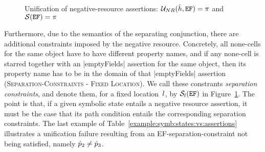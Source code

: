 \begin{figure}[!t]
{\scriptsize
{}}
\vspace*{-0.6cm}
\caption{Unification of negative-resource assertions: ${\mathcal{U}}_{NR}(\hat{h}, \mathtt{EF}) = \pi$ and ${\mathcal{S}}(\mathtt{EF}) = \pi$}
\label{fig:unineg}
\vspace*{-0.2cm}
\end{figure}

Furthermore, due to the semantics of the separating conjunction, there are additional  constraints imposed by the negative resource. Concretely, all none-cells for the same object have to have different property names, and if any none-cell is starred together with an \jsinline|emptyFields| assertion for the same object, then its property name has to be in the domain of that \jsinline|emptyFields| assertion (\textsc{Separation-Constraints - Fixed Location}). 
We call these constrants \emph{separation constraints}, and denote them, for a fixed location~$l$, by ${\mathcal{S}}_{l}(\mathtt{EF})$ in Figure~\ref{fig:unineg}. The point is that, if a given symbolic state entails a negative resource assertion, it must be the case that its path condition entails the corresponding separation constraints.
The last example of Table~\ref{example:symb:states:vs:assertions} illustrates a unification failure resulting from an EF-separation-constraint not being satisfied,
namely $\hat{p}_2 \neq \hat{p}_3$. 

